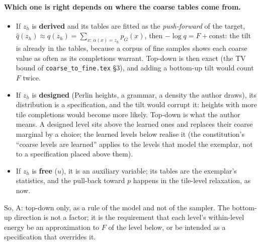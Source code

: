 \documentclass[11pt]{article}
\newcommand{\1}{\mathds{1}}
\begin{document}
\paragraph{Which one is right depends on where the coarse tables come from.}
\begin{itemize}
  \item If $z_h$ is \textbf{derived} and its tables are fitted as the
        \emph{push-forward} of the target, $\hat q(z_h) \approx q(z_h) = \sum_{x:\,\alpha(x) = z_h} p_G(x)$,
        then $-\log q = F + \text{const}$: the tilt is already in the tables,
        because a corpus of fine samples shows each coarse value as often as its
        completions warrant. Top-down is then exact (the $\mathrm{TV}$ bound of
        \texttt{coarse\_to\_fine.tex} \S3), and adding a bottom-up tilt would
        count $F$ twice.
  \item If $z_h$ is \textbf{designed} (Perlin heights, a grammar, a density the
        author draws), its distribution is a specification, and the tilt would
        corrupt it: heights with more tile completions would become more
        likely. Top-down is what the author means. A designed level sits above
        the learned ones and replaces their coarse marginal by a choice; the
        learned levels below realise it (the constitution's ``coarse levels are
        learned'' applies to the levels that model the exemplar, not to a
        specification placed above them).
  \item If $z_h$ is \textbf{free} ($u$), it is an auxiliary variable; its tables
        are the exemplar's statistics, and the pull-back toward $p$ happens in
        the tile-level relaxation, as now.
\end{itemize}
So, A: top-down only, as a rule of the model and not of the sampler. The
bottom-up direction is not a factor; it is the requirement that each level's
within-level energy be an approximation to $F$ of the level below, or be
intended as a specification that overrides it.
\end{document}
